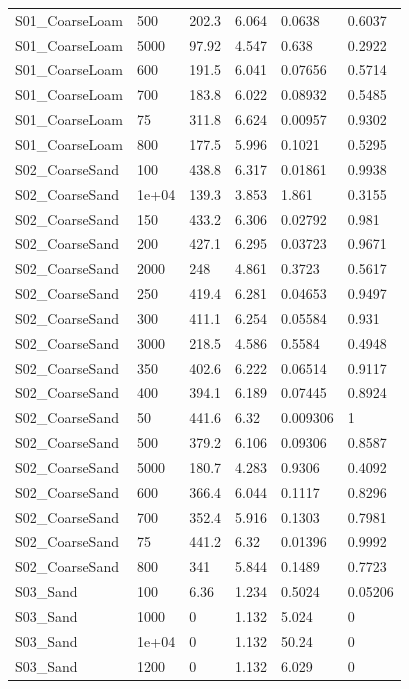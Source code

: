 {\begin{longtable}
{}S01\_CoarseLoam & 500 & 202.3 & 6.064 & 0.0638 & 0.6037\\
{}S01\_CoarseLoam & 5000 & 97.92 & 4.547 & 0.638 & 0.2922\\
{}S01\_CoarseLoam & 600 & 191.5 & 6.041 & 0.07656 & 0.5714\\
{}S01\_CoarseLoam & 700 & 183.8 & 6.022 & 0.08932 & 0.5485\\
{}S01\_CoarseLoam & 75 & 311.8 & 6.624 & 0.00957 & 0.9302\\
{}S01\_CoarseLoam & 800 & 177.5 & 5.996 & 0.1021 & 0.5295\\
{}S02\_CoarseSand & 100 & 438.8 & 6.317 & 0.01861 & 0.9938\\
{}S02\_CoarseSand & 1e+04 & 139.3 & 3.853 & 1.861 & 0.3155\\
{}S02\_CoarseSand & 150 & 433.2 & 6.306 & 0.02792 & 0.981\\
{}S02\_CoarseSand & 200 & 427.1 & 6.295 & 0.03723 & 0.9671\\
{}S02\_CoarseSand & 2000 & 248 & 4.861 & 0.3723 & 0.5617\\
{}S02\_CoarseSand & 250 & 419.4 & 6.281 & 0.04653 & 0.9497\\
{}S02\_CoarseSand & 300 & 411.1 & 6.254 & 0.05584 & 0.931\\
{}S02\_CoarseSand & 3000 & 218.5 & 4.586 & 0.5584 & 0.4948\\
{}S02\_CoarseSand & 350 & 402.6 & 6.222 & 0.06514 & 0.9117\\
{}S02\_CoarseSand & 400 & 394.1 & 6.189 & 0.07445 & 0.8924\\
{}S02\_CoarseSand & 50 & 441.6 & 6.32 & 0.009306 & 1\\
{}S02\_CoarseSand & 500 & 379.2 & 6.106 & 0.09306 & 0.8587\\
{}S02\_CoarseSand & 5000 & 180.7 & 4.283 & 0.9306 & 0.4092\\
{}S02\_CoarseSand & 600 & 366.4 & 6.044 & 0.1117 & 0.8296\\
{}S02\_CoarseSand & 700 & 352.4 & 5.916 & 0.1303 & 0.7981\\
{}S02\_CoarseSand & 75 & 441.2 & 6.32 & 0.01396 & 0.9992\\
{}S02\_CoarseSand & 800 & 341 & 5.844 & 0.1489 & 0.7723\\
{}S03\_Sand & 100 & 6.36 & 1.234 & 0.5024 & 0.05206\\
{}S03\_Sand & 1000 & 0 & 1.132 & 5.024 & 0\\
{}S03\_Sand & 1e+04 & 0 & 1.132 & 50.24 & 0\\
{}S03\_Sand & 1200 & 0 & 1.132 & 6.029 & 0\\

\end{longtable}}
